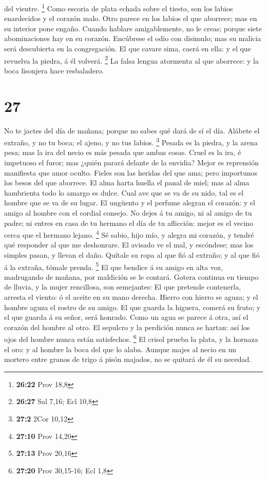 del vientre. \footnote{\textbf{26:22} Prov 18,8}  Como
escoria de plata echada sobre el tiesto, son los labios enardecidos y el
corazón malo.  Otro parece en los labios el que aborrece;
mas en su interior pone engaño.  Cuando hablare
amigablemente, no le creas; porque siete abominaciones hay en su
corazón.  Encúbrese el odio con disimulo; mas su malicia
será descubierta en la congregación.  El que cavare sima,
caerá en ella: y el que revuelva la piedra, á él volverá. \footnote{\textbf{26:27}
  Sal 7,16; Ecl 10,8}  La falsa lengua atormenta al que
aborrece: y la boca lisonjera hace resbaladero.

\hypertarget{section-26}{%
\section{27}\label{section-26}}

 No te jactes del día de mañana; porque no sabes qué dará
de sí el día.  Alábete el extraño, y no tu boca; el ajeno,
y no tus labios. \footnote{\textbf{27:2} 2Cor 10,12} 
Pesada es la piedra, y la arena pesa; mas la ira del necio es más pesada
que ambas cosas.  Cruel es la ira, é impetuoso el furor;
mas ¿quién parará delante de la envidia?  Mejor es
reprensión manifiesta que amor oculto.  Fieles son las
heridas del que ama; pero importunos los besos del que aborrece.
 El alma harta huella el panal de miel; mas al alma
hambrienta todo lo amargo es dulce.  Cual ave que se va de
su nido, tal es el hombre que se va de su lugar.  El
ungüento y el perfume alegran el corazón: y el amigo al hombre con el
cordial consejo.  No dejes á tu amigo, ni al amigo de tu
padre; ni entres en casa de tu hermano el día de tu aflicción: mejor es
el vecino cerca que el hermano lejano. \footnote{\textbf{27:10} Prov
  14,20}  Sé sabio, hijo mío, y alegra mi corazón, y
tendré qué responder al que me deshonrare.  El avisado ve
el mal, y escóndese; mas los simples pasan, y llevan el daño.
 Quítale su ropa al que fió al extraño; y al que fió á la
extraña, tómale prenda. \footnote{\textbf{27:13} Prov 20,16}
 El que bendice á su amigo en alta voz, madrugando de
mañana, por maldición se le contará.  Gotera continua en
tiempo de lluvia, y la mujer rencillosa, son semejantes: 
El que pretende contenerla, arresta el viento: ó el aceite en su mano
derecha.  Hierro con hierro se aguza; y el hombre aguza
el rostro de su amigo.  El que guarda la higuera, comerá
su fruto; y el que guarda á su señor, será honrado.  Como
un agua se parece á otra, así el corazón del hombre al otro.
 El sepulcro y la perdición nunca se hartan: así los ojos
del hombre nunca están satisfechos. \footnote{\textbf{27:20} Prov
  30,15-16; Ecl 1,8}  El crisol prueba la plata, y la
hornaza el oro: y al hombre la boca del que lo alaba. 
Aunque majes al necio en un mortero entre granos de trigo á pisón
majados, no se quitará de él su necedad.

